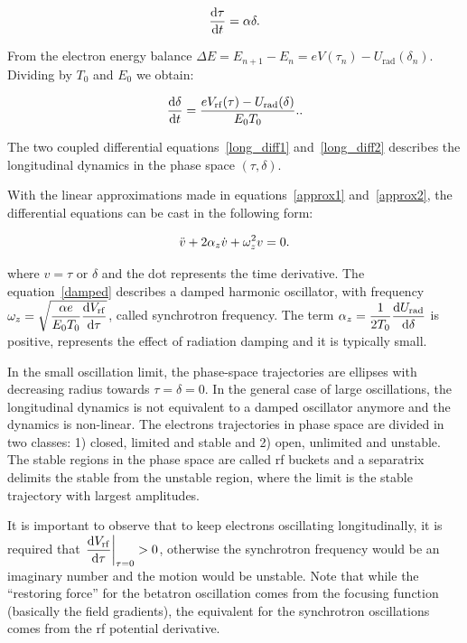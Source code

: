 \begin{equation}
\dfrac{\mathrm{d} \tau}{\mathrm{d} t} = \alpha \delta.
\label{long_diff1}
\end{equation}

From the electron energy balance $\Delta E = E_{n+1} - E_n = eV(\tau_n) - U_{\mathrm{rad}}(\delta_n)$. Dividing by $T_0$ and $E_0$ we obtain:

\begin{equation}
    \dfrac{\mathrm{d} \delta}{\mathrm{d} t} = \dfrac{eV_{\mathrm{rf}}(\tau) - U_{\mathrm{rad}}(\delta)}{E_0 T_0}.
    \label{long_diff2}.
\end{equation}

The two coupled differential equations~\eqref{long_diff1} and~\eqref{long_diff2} describes the longitudinal dynamics in the phase space $(\tau, \delta)$.

With the linear approximations made in equations~\eqref{approx1} and~\eqref{approx2}, the differential equations can be cast in the following form:

\begin{equation}
    \Ddot{v} + 2\alpha_{z} \dot{v} + \omega_{z}^2 v = 0.
    \label{damped}
\end{equation}

where $v=\tau$ or $\delta$ and the dot represents the time derivative. The equation~\eqref{damped} describes a damped harmonic oscillator, with frequency $\omega_z = \sqrt{\dfrac{\alpha e}{E_0 T_0} \dfrac{\mathrm{d} V_{\mathrm{rf}}}{\mathrm{d} \tau}}$, called synchrotron frequency. The term $\alpha_z = \dfrac{1}{2T_0} \dfrac{\mathrm{d} U_{\mathrm{rad}}}{\mathrm{d} \delta}$ is positive, represents the effect of radiation damping and it is typically small. 

In the small oscillation limit, the phase-space trajectories are ellipses with decreasing radius towards $\tau = \delta = 0$. In the general case of large oscillations, the longitudinal dynamics is not equivalent to a damped oscillator anymore and the dynamics is non-linear. The electrons trajectories in phase space are divided in two classes: 1) closed, limited and stable and 2) open, unlimited and unstable. The stable regions in the phase space are called \gls{rf} buckets and a separatrix delimits the stable from the unstable region, where the limit is the stable trajectory with largest amplitudes.

It is important to observe that to keep electrons oscillating longitudinally, it is required that $\left.\dfrac{\mathrm{d} V_{\mathrm{rf}}}{\mathrm{d} \tau}\right|_{\tau = 0} > 0$, otherwise the synchrotron frequency would be an imaginary number and the motion would be unstable. Note that while the ``restoring force'' for the betatron oscillation comes from the focusing function (basically the field gradients), the equivalent for the synchrotron oscillations comes from the \gls{rf} potential derivative.

